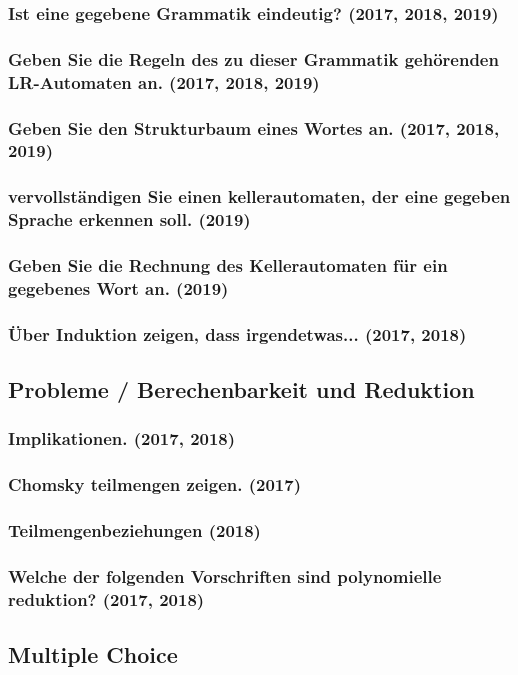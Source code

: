 \subsubsection{Ist eine gegebene Grammatik eindeutig? (2017, 2018, 2019)}

\subsubsection{Geben Sie die Regeln des zu dieser Grammatik gehörenden LR-Automaten an. (2017, 2018, 2019)}

\subsubsection{Geben Sie den Strukturbaum eines Wortes an. (2017, 2018, 2019)}

\subsubsection{vervollständigen Sie einen kellerautomaten, der eine gegeben Sprache erkennen soll. (2019)}

\subsubsection{Geben Sie die Rechnung des Kellerautomaten für ein gegebenes Wort an. (2019)}

\subsubsection{Über Induktion zeigen, dass irgendetwas... (2017, 2018)}

\subsection{Probleme / Berechenbarkeit und Reduktion}

\subsubsection{Implikationen. (2017, 2018)}

\subsubsection{Chomsky teilmengen zeigen. (2017)}

\subsubsection{Teilmengenbeziehungen (2018)}

\subsubsection{Welche der folgenden Vorschriften sind polynomielle reduktion? (2017, 2018)}

\subsection{Multiple Choice}